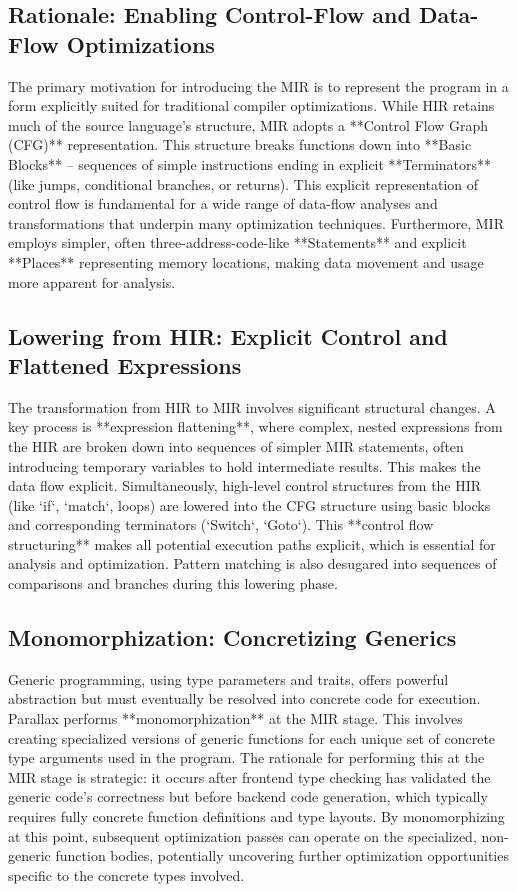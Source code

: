 \subsection{Rationale: Enabling Control-Flow and Data-Flow Optimizations} %
The primary motivation for introducing the MIR is to represent the program in a form explicitly suited for traditional compiler optimizations. While HIR retains much of the source language's structure, MIR adopts a **Control Flow Graph (CFG)** representation. This structure breaks functions down into **Basic Blocks** – sequences of simple instructions ending in explicit **Terminators** (like jumps, conditional branches, or returns). This explicit representation of control flow is fundamental for a wide range of data-flow analyses and transformations that underpin many optimization techniques. Furthermore, MIR employs simpler, often three-address-code-like **Statements** and explicit **Places** representing memory locations, making data movement and usage more apparent for analysis.

\subsection{Lowering from HIR: Explicit Control and Flattened Expressions} %
The transformation from HIR to MIR involves significant structural changes. A key process is **expression flattening**, where complex, nested expressions from the HIR are broken down into sequences of simpler MIR statements, often introducing temporary variables to hold intermediate results. This makes the data flow explicit. Simultaneously, high-level control structures from the HIR (like `if`, `match`, loops) are lowered into the CFG structure using basic blocks and corresponding terminators (`Switch`, `Goto`). This **control flow structuring** makes all potential execution paths explicit, which is essential for analysis and optimization. Pattern matching is also desugared into sequences of comparisons and branches during this lowering phase.

\subsection{Monomorphization: Concretizing Generics} %
Generic programming, using type parameters and traits, offers powerful abstraction but must eventually be resolved into concrete code for execution. Parallax performs **monomorphization** at the MIR stage. This involves creating specialized versions of generic functions for each unique set of concrete type arguments used in the program. The rationale for performing this at the MIR stage is strategic: it occurs after frontend type checking has validated the generic code's correctness but before backend code generation, which typically requires fully concrete function definitions and type layouts. By monomorphizing at this point, subsequent optimization passes can operate on the specialized, non-generic function bodies, potentially uncovering further optimization opportunities specific to the concrete types involved.


